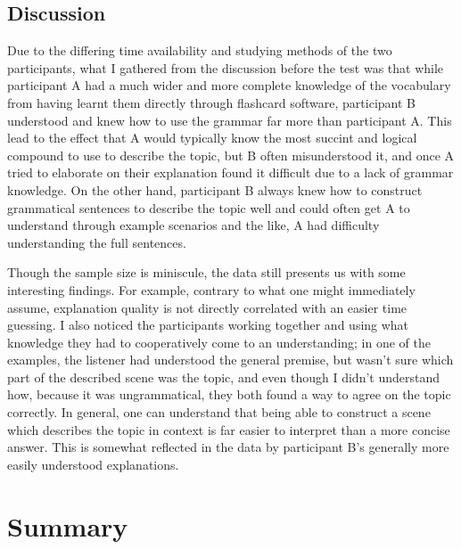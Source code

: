 \documentclass[a4paper,10pt]{article}
\begin{document}
\subsection{Discussion}
Due to the differing time availability and studying methods of the two participants, what I gathered
from the discussion before the test was that while participant A had a much wider and more complete
knowledge of the vocabulary from having learnt them directly through flashcard software, participant B
understood and knew how to use the grammar far more than participant A. This lead to the effect that
A would typically know the most succint and logical compound to use to describe the topic, but B often
misunderstood it, and once A tried to elaborate on their explanation found it difficult due to a lack
of grammar knowledge. On the other hand, participant B always knew how to construct grammatical sentences
to describe the topic well and could often get A to understand through example scenarios and the like,
A had difficulty understanding the full sentences.

Though the sample size is miniscule, the data still presents us with some interesting findings.
For example, contrary to what one might immediately assume, explanation quality is not directly
correlated with an easier time guessing. I also noticed the participants working together and using
what knowledge they had to cooperatively come to an understanding; in one of the examples, the listener
had understood the general premise, but wasn't sure which part of the described scene was the topic, and
even though I didn't understand how, because it was ungrammatical, they both found a way to agree on
the topic correctly. In general, one can understand that being able to construct a scene which
describes the topic in context is far easier to interpret than a more concise answer. This is somewhat
reflected in the data by participant B's generally more easily understood explanations.


\section{Summary}
\end{document}
